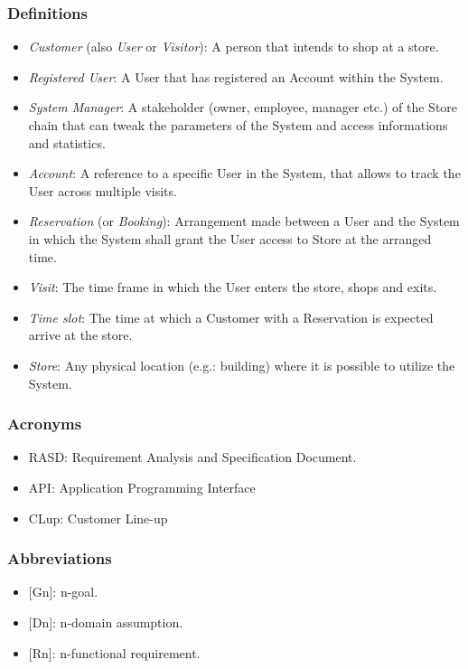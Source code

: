 \subsubsection{Definitions}
\begin{itemize}
    \item \emph{Customer} (also \emph{User} or \emph{Visitor}): A person that intends to shop at a store.
    \item \emph{Registered User}: A User that has registered an Account within the System.
    \item \emph{System Manager}: A stakeholder (owner, employee, manager etc.) of the Store chain that can tweak the parameters of the System and access informations and statistics.
    \item \emph{Account}: A reference to a specific User in the System, that allows to track the User across multiple visits.
    \item \emph{Reservation} (or \emph{Booking}): Arrangement made between a User and the System in which the System shall grant the User access to Store at the arranged time.
    \item \emph{Visit}: The time frame in which the User enters the store, shops and exits.
    \item \emph{Time slot}: The time at which a Customer with a Reservation is expected arrive at the store.
    \item \emph{Store}: Any physical location (e.g.: building) where it is possible to utilize the System.
\end{itemize}

\subsubsection{Acronyms}
\begin{itemize}
    \item RASD: Requirement Analysis and Specification Document.
    \item API: Application Programming Interface
    \item CLup: Customer Line-up
\end{itemize}


\subsubsection{Abbreviations}
\begin{itemize}
    \item {[Gn]}: n-goal.
    \item {[Dn]}: n-domain assumption.
    \item {[Rn]}: n-functional requirement.
\end{itemize}

